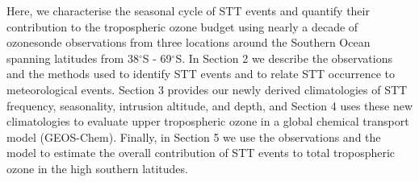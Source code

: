 Here, we characterise the seasonal cycle of STT events and quantify their contribution to the tropospheric ozone budget using nearly a decade of ozonesonde observations from three locations around the Southern Ocean spanning latitudes from 38$^{\circ}$S - 69$^{\circ}$S. 
In Section 2 we describe the observations and the methods used to identify STT events and to relate STT occurrence to meteorological events.
Section 3 provides our newly derived climatologies of STT frequency, seasonality, intrusion altitude, and depth, and Section 4 uses these new climatologies to evaluate upper tropospheric ozone in a global chemical transport model (GEOS-Chem). 
Finally, in Section 5 we use the observations and the model to estimate the overall contribution of STT events to total tropospheric ozone in the high southern latitudes.
